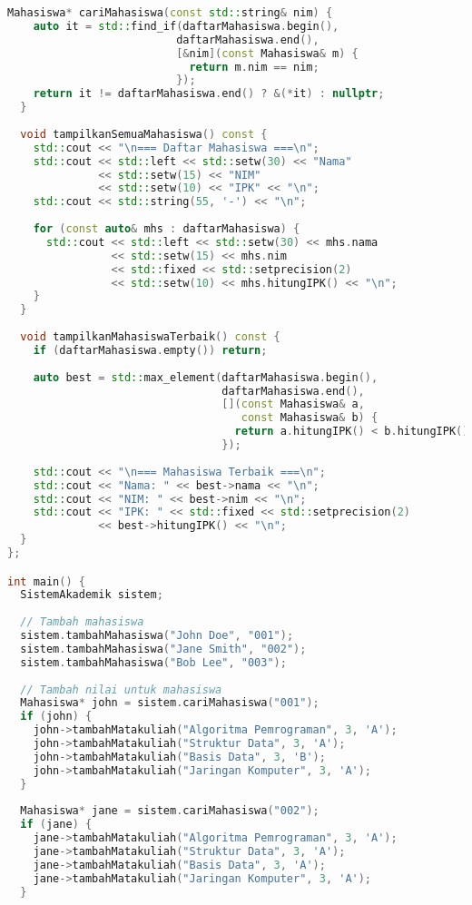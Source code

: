 \documentclass[../main.tex]{subfiles}
\begin{document}
\begin{lstlisting}[language=C++, caption={Sistem manajemen mahasiswa di C++}]
  Mahasiswa* cariMahasiswa(const std::string& nim) {
    auto it = std::find_if(daftarMahasiswa.begin(), 
                          daftarMahasiswa.end(),
                          [&nim](const Mahasiswa& m) {
                            return m.nim == nim;
                          });
    return it != daftarMahasiswa.end() ? &(*it) : nullptr;
  }
  
  void tampilkanSemuaMahasiswa() const {
    std::cout << "\n=== Daftar Mahasiswa ===\n";
    std::cout << std::left << std::setw(30) << "Nama"
              << std::setw(15) << "NIM"
              << std::setw(10) << "IPK" << "\n";
    std::cout << std::string(55, '-') << "\n";
    
    for (const auto& mhs : daftarMahasiswa) {
      std::cout << std::left << std::setw(30) << mhs.nama
                << std::setw(15) << mhs.nim
                << std::fixed << std::setprecision(2)
                << std::setw(10) << mhs.hitungIPK() << "\n";
    }
  }
  
  void tampilkanMahasiswaTerbaik() const {
    if (daftarMahasiswa.empty()) return;
    
    auto best = std::max_element(daftarMahasiswa.begin(),
                                 daftarMahasiswa.end(),
                                 [](const Mahasiswa& a, 
                                    const Mahasiswa& b) {
                                   return a.hitungIPK() < b.hitungIPK();
                                 });
    
    std::cout << "\n=== Mahasiswa Terbaik ===\n";
    std::cout << "Nama: " << best->nama << "\n";
    std::cout << "NIM: " << best->nim << "\n";
    std::cout << "IPK: " << std::fixed << std::setprecision(2)
              << best->hitungIPK() << "\n";
  }
};

int main() {
  SistemAkademik sistem;
  
  // Tambah mahasiswa
  sistem.tambahMahasiswa("John Doe", "001");
  sistem.tambahMahasiswa("Jane Smith", "002");
  sistem.tambahMahasiswa("Bob Lee", "003");
  
  // Tambah nilai untuk mahasiswa
  Mahasiswa* john = sistem.cariMahasiswa("001");
  if (john) {
    john->tambahMatakuliah("Algoritma Pemrograman", 3, 'A');
    john->tambahMatakuliah("Struktur Data", 3, 'A');
    john->tambahMatakuliah("Basis Data", 3, 'B');
    john->tambahMatakuliah("Jaringan Komputer", 3, 'A');
  }
  
  Mahasiswa* jane = sistem.cariMahasiswa("002");
  if (jane) {
    jane->tambahMatakuliah("Algoritma Pemrograman", 3, 'A');
    jane->tambahMatakuliah("Struktur Data", 3, 'A');
    jane->tambahMatakuliah("Basis Data", 3, 'A');
    jane->tambahMatakuliah("Jaringan Komputer", 3, 'A');
  }
  

\end{lstlisting}
\end{document}
